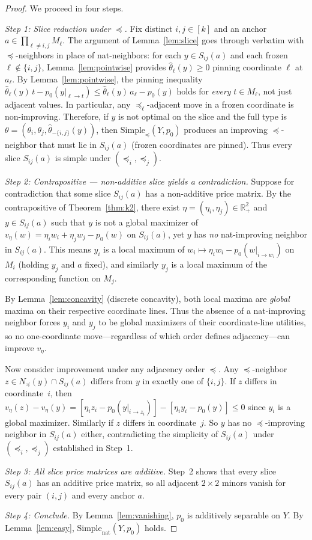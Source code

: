 \documentclass[11pt]{article}
\newcommand{\R}{\mathbb{R}}
\newcommand{\Rp}{\R_+}
\newcommand{\Simplenat}{\mathrm{Simple}_{\mathrm{nat}}}
\newcommand{\Simpleord}{\mathrm{Simple}_{\preceq}}
\begin{document}
\begin{proof}
We proceed in four steps.

\emph{Step 1: Slice reduction under $\preceq$.}
Fix distinct $i,j \in [k]$ and an anchor $a \in \prod_{\ell \neq i,j} M_\ell$.
The argument of Lemma~\ref{lem:slice} goes through verbatim with
$\preceq$-neighbors in place of nat-neighbors:
for each $y \in S_{ij}(a)$ and each frozen $\ell \notin \{i,j\}$,
Lemma~\ref{lem:pointwise} provides $\hat\theta_\ell(y) \geq 0$ pinning
coordinate $\ell$ at $a_\ell$.
By Lemma~\ref{lem:pointwise}, the pinning inequality
$\hat\theta_\ell(y)\, t - p_0(y|_{\ell \to t}) \leq
 \hat\theta_\ell(y)\, a_\ell - p_0(y)$
holds for \emph{every} $t \in M_\ell$, not just adjacent values.
In particular, any $\preceq_\ell$-adjacent move in a frozen coordinate
is non-improving.
Therefore, if $y$ is not optimal on the slice and the full type is
$\theta = (\theta_i, \theta_j, \hat\theta_{-\{i,j\}}(y))$,
then $\Simpleord(Y,p_0)$ produces an improving $\preceq$-neighbor
that must lie in $S_{ij}(a)$ (frozen coordinates are pinned).
Thus every slice $S_{ij}(a)$ is simple under $(\preceq_i, \preceq_j)$.

\emph{Step 2: Contrapositive --- non-additive slice yields a contradiction.}
Suppose for contradiction that some slice $S_{ij}(a)$ has a non-additive price matrix.
By the contrapositive of Theorem~\ref{thm:k2},
there exist $\eta = (\eta_i, \eta_j) \in \Rp^2$ and $y \in S_{ij}(a)$
such that $y$ is not a global maximizer of
$v_\eta(w) = \eta_i w_i + \eta_j w_j - p_0(w)$ on $S_{ij}(a)$,
yet $y$ has \emph{no} nat-improving neighbor in $S_{ij}(a)$.
This means $y_i$ is a local maximum of $w_i \mapsto \eta_i w_i - p_0(w|_{i \to w_i})$
on $M_i$ (holding $y_j$ and $a$ fixed), and similarly $y_j$ is a local maximum
of the corresponding function on $M_j$.

By Lemma~\ref{lem:concavity} (discrete concavity), both local maxima are
\emph{global} maxima on their respective coordinate lines.
Thus the absence of a nat-improving neighbor forces $y_i$ and $y_j$ to be
global maximizers of their coordinate-line utilities, so no
one-coordinate move---regardless of which order defines adjacency---can
improve $v_\eta$.

Now consider improvement under any adjacency order $\preceq$.
Any $\preceq$-neighbor $z \in N_\preceq(y) \cap S_{ij}(a)$ differs from $y$
in exactly one of $\{i,j\}$.  If $z$ differs in coordinate~$i$, then
$v_\eta(z) - v_\eta(y) = [\eta_i z_i - p_0(y|_{i \to z_i})] - [\eta_i y_i - p_0(y)] \leq 0$
since $y_i$ is a global maximizer.  Similarly if $z$ differs in coordinate~$j$.
So $y$ has no $\preceq$-improving neighbor in $S_{ij}(a)$ either,
contradicting the simplicity of $S_{ij}(a)$ under $(\preceq_i, \preceq_j)$
established in Step~1.

\emph{Step 3: All slice price matrices are additive.}
Step~2 shows that every slice $S_{ij}(a)$ has an additive price matrix,
so all adjacent $2 \times 2$ minors vanish for every pair $(i,j)$ and every anchor $a$.

\emph{Step 4: Conclude.}
By Lemma~\ref{lem:vanishing}, $p_0$ is additively separable on $Y$.
By Lemma~\ref{lem:easy}, $\Simplenat(Y, p_0)$ holds.
\end{proof}
\end{document}
